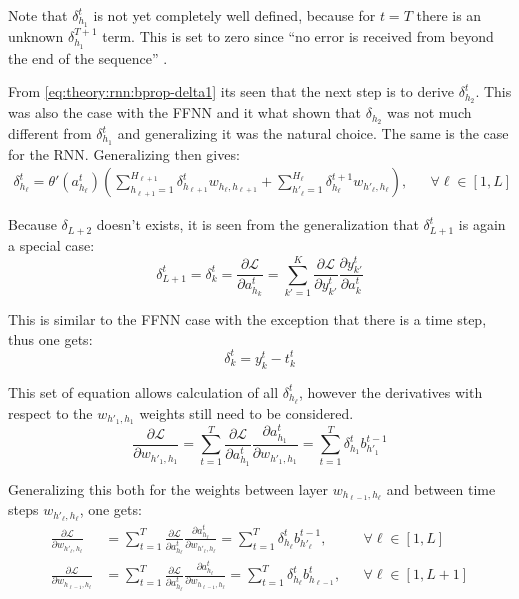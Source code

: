 Note that $\delta_{h_1}^{t}$ is not yet completely well defined, because for $t = T$ there is an unknown $\delta_{h_1}^{T+1}$ term. This is set to zero since ``no error is received from beyond the end of the sequence'' \cite{alexgraves}.

From \eqref{eq:theory:rnn:bprop-delta1} its seen that the next step is to derive $\delta_{h_2}^t$. This was also the case with the FFNN and it what shown that $\delta_{h_2}$ was not much different from $\delta_{h_1}^{t}$ and generalizing it was the natural choice. The same is the case for the RNN. Generalizing then gives:
\begin{equation}
\begin{aligned}
\delta_{h_\ell}^t = \theta'(a_{h_\ell}^t) \left( \sum_{h_{\ell+1}=1}^{H_{\ell+1}} \delta_{h_{\ell +1}}^t w_{h_\ell, h_{\ell + 1}}
+ \sum_{h'_\ell=1}^{H_\ell} \delta_{h_\ell}^{t+1} w_{h'_\ell, h_\ell} \right), && \forall \ell \in [1, L]
\end{aligned}
\end{equation}

Because $\delta_{L+2}$ doesn't exists, it is seen from the generalization that $\delta_{L+1}^t$ is again a special case:
\begin{equation}
\delta_{L+1}^t = \delta_{k}^t = \frac{\partial \mathcal{L}}{\partial a_{h_k}^t} = \sum_{k'=1}^K \frac{\partial \mathcal{L}}{\partial y_{k'}^t} \frac{\partial y_{k'}^t}{\partial a_k^t}
\end{equation}

This is similar to the FFNN case with the exception that there is a time step, thus one gets:
\begin{equation}
\delta_{k}^t = y_k^t - t_k^t
\end{equation}

This set of equation allows calculation of all $\delta_{h_\ell}^t$, however the derivatives with respect to the $w_{h'_1, h_1}$ weights still need to be considered.
\begin{equation}
\frac{\partial \mathcal{L}}{\partial w_{h'_1, h_1}} = \sum_{t=1}^T \frac{\partial \mathcal{L}}{\partial a_{h_1}^t} \frac{\partial a_{h_1}^t}{\partial w_{h'_1, h_1}} = \sum_{t=1}^T \delta_{h_1}^t b_{h'_1}^{t-1}
\end{equation}

Generalizing this both for the weights between layer $w_{h_{\ell - 1}, h_\ell}$ and between time steps $w_{h'_{\ell}, h_\ell}$, one gets:
\begin{align}
\frac{\partial \mathcal{L}}{\partial w_{h'_\ell, h_\ell}} &= \sum_{t=1}^T \frac{\partial \mathcal{L}}{\partial a_{h_\ell}^t} \frac{\partial a_{h_\ell}^t}{\partial w_{h'_\ell, h_\ell}} = \sum_{t=1}^T \delta_{h_\ell}^t b_{h'_\ell}^{t-1}, && \forall \ell \in [1, L] \\
\frac{\partial \mathcal{L}}{\partial w_{h_{\ell - 1}, h_\ell}} &= \sum_{t=1}^T \frac{\partial \mathcal{L}}{\partial a_{h_\ell}^t} \frac{\partial a_{h_\ell}^t}{\partial w_{h_{\ell-1}, h_\ell}} = \sum_{t=1}^T \delta_{h_\ell}^t b_{h_{\ell-1}}^t, && \forall \ell \in [1, L + 1] 
\end{align}
